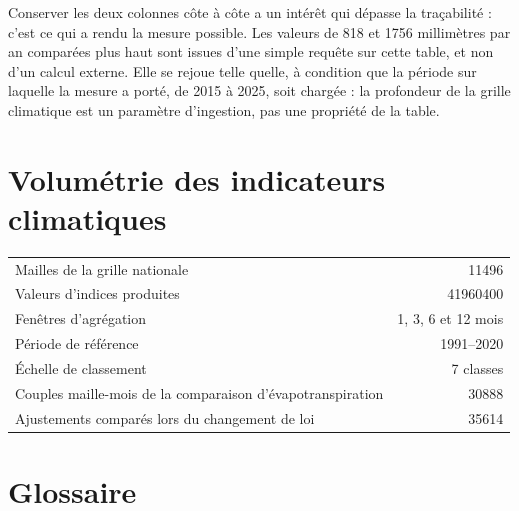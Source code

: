 Conserver les deux colonnes côte à côte a un intérêt qui dépasse la traçabilité : c'est ce qui a
rendu la mesure possible. Les valeurs de \num{818} et \num{1756} millimètres par an comparées
plus haut sont issues d'une simple requête sur cette table, et non d'un calcul externe. Elle se
rejoue telle quelle, à condition que la période sur laquelle la mesure a porté, de 2015 à 2025,
soit chargée : la profondeur de la grille climatique est un paramètre d'ingestion, pas une
propriété de la table.

\section{Volumétrie des indicateurs climatiques}

\begin{center}
\begin{tabularx}{\textwidth}{@{}Xr@{}}
\toprule
Mailles de la grille nationale & \num{11496} \\
Valeurs d'indices produites & \num{41960400} \\
Fenêtres d'agrégation & 1, 3, 6 et 12 mois \\
Période de référence & 1991--2020 \\
Échelle de classement & 7 classes \\
Couples maille-mois de la comparaison d'évapotranspiration & \num{30888} \\
Ajustements comparés lors du changement de loi & \num{35614} \\
\bottomrule
\end{tabularx}
\end{center}

\section{Glossaire}

